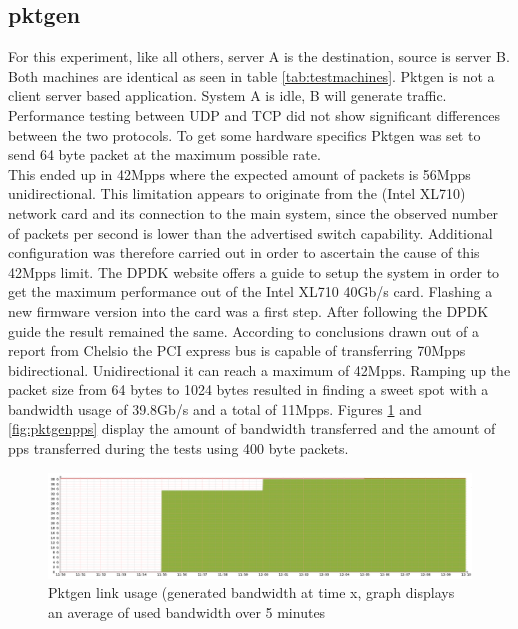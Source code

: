 \subsection{pktgen}\label{sub:pktgen}
For this experiment, like all others, server A is the destination, source is server B. Both machines are identical as seen in table \ref{tab:testmachines}. Pktgen is not a client server based application. System A is idle, B will generate traffic. Performance testing between UDP and TCP did not show significant differences between the two protocols. To get some hardware specifics Pktgen was set to send 64 byte packet at the maximum possible rate.\\ 
This ended up in 42Mpps where the expected amount of packets is 56Mpps unidirectional. This limitation appears to originate from the (Intel XL710) network card and its connection to the main system, since the observed number of packets per second is lower than the advertised switch capability. Additional configuration was therefore carried out in order to ascertain the cause of this 42Mpps limit. The DPDK website offers a guide to setup the system in order to get the maximum performance out of the Intel XL710 40Gb/s card. Flashing a new firmware version into the card was a first step. After following the DPDK guide the result remained the same. According to conclusions drawn out of a report from Chelsio \cite{chelsio} the PCI express bus is capable of transferring 70Mpps bidirectional. Unidirectional it can reach a maximum of 42Mpps. Ramping up the packet size from 64 bytes to 1024 bytes resulted in finding a sweet spot with a bandwidth usage of 39.8Gb/s and a total of 11Mpps. Figures \ref{fig:pktgenlink} and \ref{fig:pktgenpps} display the amount of bandwidth transferred and the amount of pps transferred during the tests using 400 byte packets. 

\begin{figure}
  \includegraphics[scale=0.35]{images/pktgen_link_usage.png}
  \caption{Pktgen link usage (generated bandwidth at time x, graph displays an average of used bandwidth over 5 minutes}
  \label{fig:pktgenlink}
\end{figure}

